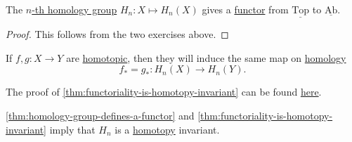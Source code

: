\begin{theorem}\label{thm:homology-group-defines-a-functor}
	The \hyperref[def:homology-group]{\(n\)-th homology group} \(H_n \colon X \mapsto H_n(X)\) gives a \hyperref[def:functor]{functor} from \(\underline{\mathrm{Top}}\)
	to \(\underline{\mathrm{Ab} }\).
\end{theorem}
\begin{proof}
	This follows from the two exercises above.
\end{proof}

\begin{theorem}\label{thm:functoriality-is-homotopy-invariant}
	If \(f, g\colon X \to Y\) are \hyperref[def:homotopic]{homotopic}, then they will induce the same map on \hyperref[def:homology-group]{homology}
	\[
		f_\ast = g_\ast \colon H_n(X) \to H_n(Y).
	\]
\end{theorem}
The proof of \autoref{thm:functoriality-is-homotopy-invariant} can be found \hyperref[pf:functoriality-is-homotopy-invariant]{here}.

\begin{exercise}
	\autoref{thm:homology-group-defines-a-functor} and \autoref{thm:functoriality-is-homotopy-invariant} imply that \(H_{n} \) is a \hyperref[def:homotopy]{homotopy} invariant.
\end{exercise}